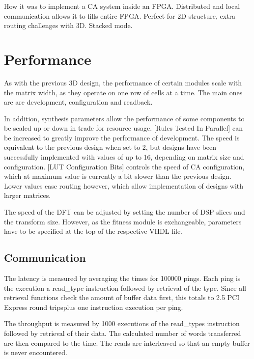 \TODO
How it was to implement a CA system inside an FPGA.
Distributed and local communication allows it to fills entire FPGA.
Perfect for 2D structure, extra routing challenges with 3D.
Stacked mode.


\section{Performance}

As with the previous 3D design, the performance of certain modules scale with the matrix width, as they operate on one row of cells at a time.
The main ones are are development, configuration and readback.

In addition, synthesis parameters allow the performance of some components to be scaled up or down in trade for resource usage.
[Rules Tested In Parallel] can be increased to greatly improve the performance of development.
The speed is equivalent to the previous design when set to 2, but designs have been successfully implemented with values of up to 16, depending on matrix size and configuration.
[LUT Configuration Bits] controls the speed of CA configuration, which at maximum value is currently a bit slower than the previous design.
Lower values ease routing however, which allow implementation of designs with larger matrices.

The speed of the DFT can be adjusted by setting the number of DSP slices and the transform size.
However, as the fitness module is exchangeable, parameters have to be specified at the top of the respective VHDL file.

\subsection{Communication}


The latency is measured by averaging the times for 100000 pings.
Each ping is the execution a read\_type instruction followed by retrieval of the type.
Since all retrieval functions check the amount of buffer data first, this totals to 2.5 PCI Express round trips\footnotemark plus one instruction execution per ping.


The throughput is measured by 1000 executions of the read\_types instruction followed by retrieval of their data.
The calculated number of words transferred are then compared to the time.
The reads are interleaved so that an empty buffer is never encountered.

